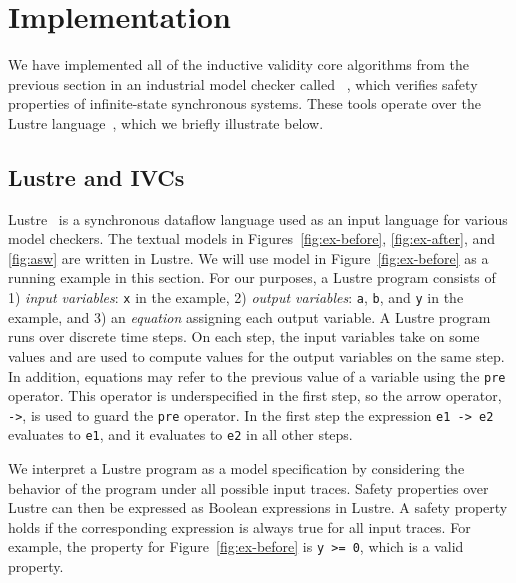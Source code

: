 \section{Implementation}
\label{sec:impl}

We have implemented all of the inductive validity core algorithms from the previous section in an industrial model checker called \jkind~\cite{jkind},
which verifies safety properties of infinite-state synchronous systems.
These tools operate over the Lustre language~\cite{Halbwachs91:lustre}, which we briefly illustrate below.

\subsection{Lustre and IVCs}
\label{sec:lustre}

Lustre~\cite{Halbwachs91:lustre} is a synchronous dataflow language
used as an input language for various model checkers. The textual
models in Figures~\ref{fig:ex-before}, \ref{fig:ex-after}, and \ref{fig:asw} are
written in Lustre. We will use model in Figure~\ref{fig:ex-before} as
a running example in this section. For our purposes, a Lustre program
consists of 1) {\em input variables}: {\tt x} in the example, 2) {\em output
variables}: {\tt a}, {\tt b}, and {\tt y} in the example, and 3) an
{\em equation} assigning each output variable. A Lustre program runs over discrete
time steps. On each step, the input variables take on some values and
are used to compute values for the output variables on the same step.
In addition, equations may refer to the previous value of a variable
using the {\tt pre} operator. This operator is underspecified in the
first step, so the arrow operator, {\tt ->}, is used to guard the
{\tt pre} operator. In the first step the expression {\tt e1 -> e2}
evaluates to {\tt e1}, and it evaluates to {\tt e2} in all other steps.

We interpret a Lustre program as a model specification by considering
the behavior of the program under all possible input traces. Safety
properties over Lustre can then be expressed as Boolean expressions in
Lustre. A safety property holds if the corresponding expression is
always true for all input traces. For example, the property for
Figure~\ref{fig:ex-before} is {\tt y >= 0}, which is a valid property.

